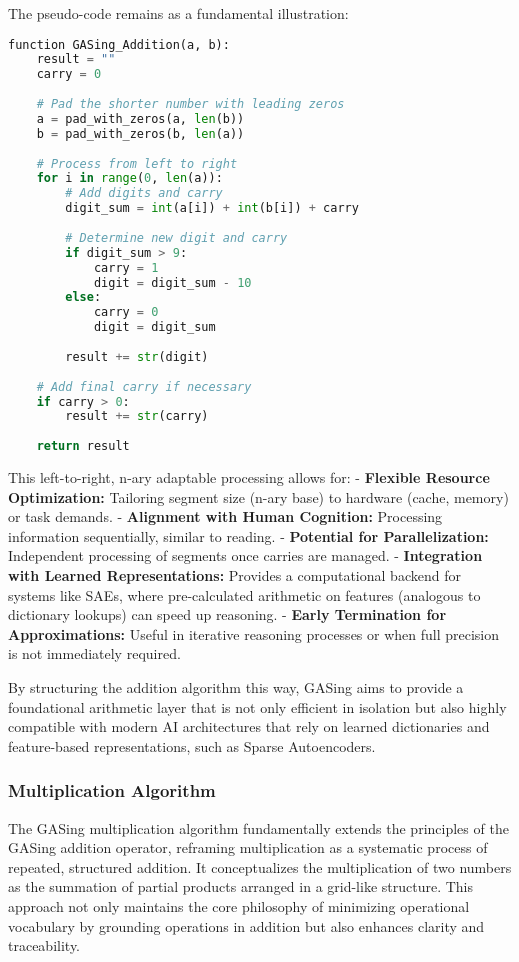 The pseudo-code remains as a fundamental illustration:

\begin{lstlisting}[language=Python,caption={GASing\_Addition Algorithm}]
function GASing_Addition(a, b):
    result = ""
    carry = 0
    
    # Pad the shorter number with leading zeros
    a = pad_with_zeros(a, len(b))
    b = pad_with_zeros(b, len(a))
    
    # Process from left to right
    for i in range(0, len(a)):
        # Add digits and carry
        digit_sum = int(a[i]) + int(b[i]) + carry
        
        # Determine new digit and carry
        if digit_sum > 9:
            carry = 1
            digit = digit_sum - 10
        else:
            carry = 0
            digit = digit_sum
            
        result += str(digit)
    
    # Add final carry if necessary
    if carry > 0:
        result += str(carry)
        
    return result
\end{lstlisting}

This left-to-right, n-ary adaptable processing allows for:
-   \textbf{Flexible Resource Optimization:} Tailoring segment size (n-ary base) to hardware (cache, memory) or task demands.
-   \textbf{Alignment with Human Cognition:} Processing information sequentially, similar to reading.
-   \textbf{Potential for Parallelization:} Independent processing of segments once carries are managed.
-   \textbf{Integration with Learned Representations:} Provides a computational backend for systems like SAEs, where pre-calculated arithmetic on features (analogous to dictionary lookups) can speed up reasoning.
-   \textbf{Early Termination for Approximations:} Useful in iterative reasoning processes or when full precision is not immediately required.

By structuring the addition algorithm this way, GASing aims to provide a foundational arithmetic layer that is not only efficient in isolation but also highly compatible with modern AI architectures that rely on learned dictionaries and feature-based representations, such as Sparse Autoencoders.
\subsubsection{Multiplication Algorithm}

The GASing multiplication algorithm fundamentally extends the principles of the GASing addition operator, reframing multiplication as a systematic process of repeated, structured addition. It conceptualizes the multiplication of two numbers as the summation of partial products arranged in a grid-like structure. This approach not only maintains the core philosophy of minimizing operational vocabulary by grounding operations in addition but also enhances clarity and traceability.

